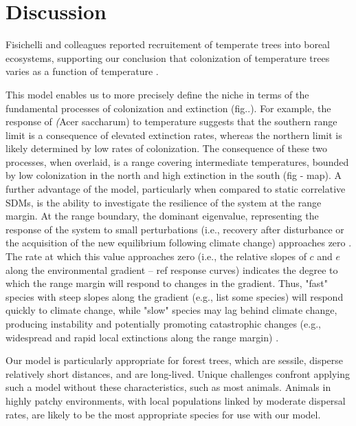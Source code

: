 \documentclass[11pt]{article}
\begin{document}
\section*{Discussion}

Fisichelli and colleagues reported recruitement of temperate trees into boreal ecosystems, supporting our conclusion that colonization of temperature trees varies as a function of temperature \cite{Fisichelli2014}.



This model enables us to more precisely define the niche in terms of the fundamental processes of colonization and extinction (fig..). 
For example, the response of \emph(Acer saccharum) to temperature suggests that the southern range limit is a consequence of elevated extinction rates, whereas the northern limit is likely determined by low rates of colonization.
The consequence of these two processes, when overlaid, is a range covering intermediate temperatures, bounded by low colonization in the north and high extinction in the south (fig - map).
A further advantage of the model, particularly when compared to static correlative SDMs, is the ability to investigate the resilience of the system at the range margin.
At the range boundary, the dominant eigenvalue, representing the response of the system to small perturbations (i.e., recovery after disturbance or the acquisition of the new equilibrium following climate change) approaches zero \cite{Scheffer2009}.
The rate at which this value approaches zero (i.e., the relative slopes of $c$ and $e$ along the environmental gradient -- ref response curves) indicates the degree to which the range margin will respond to changes in the gradient.
Thus, "fast" species with steep slopes along the gradient (e.g., list some species) will respond quickly to climate change, while "slow" species may lag behind climate change, producing instability and potentially promoting catastrophic changes (e.g., widespread and rapid local extinctions along the range margin) \cite{Scheffer2009, Scheffer2012}. %

Our model is particularly appropriate for forest trees, which are sessile, disperse relatively short distances, and are long-lived. 
Unique challenges confront applying such a model without these characteristics, such as most animals. 
Animals in highly patchy environments, with local populations linked by moderate dispersal rates, are likely to be the most appropriate species for use with our model.
\end{document}
